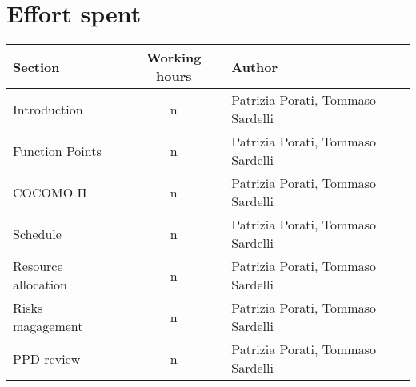 \pagebreak

\section{Effort spent}

\begin{center}
	\begin{tabular}{ l c l } 
		\hline
		Section 	& Working hours 	& Author \\ 
		\hline
		Introduction 	& n 	& Patrizia Porati, Tommaso Sardelli	\\
		Function Points	 	& n 	& Patrizia Porati, Tommaso Sardelli	\\
		COCOMO II 	& n 	& Patrizia Porati, Tommaso Sardelli \\ 
		Schedule 	& n 	& Patrizia Porati, Tommaso Sardelli	\\
		Resource allocation 	& n 	& Patrizia Porati, Tommaso Sardelli \\
		Risks magagement 	& n 	& Patrizia Porati, Tommaso Sardelli \\
		PPD review 	& n 	& Patrizia Porati, Tommaso Sardelli \\
		\hline
	\end{tabular}
	\vspace{0.4cm}
\end{center}
